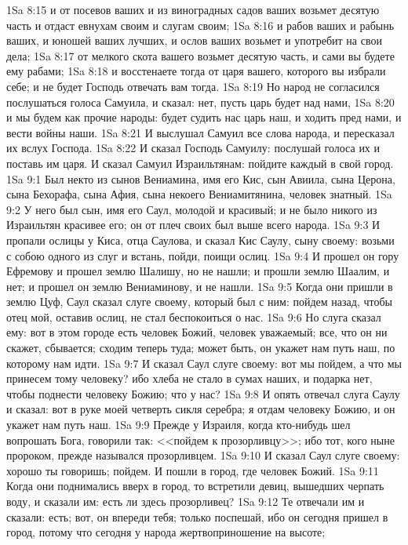 \vs 1Sa 8:15 и от посевов ваших и из виноградных садов ваших возьмет десятую часть и отдаст евнухам своим и слугам своим;
\vs 1Sa 8:16 и рабов ваших и рабынь ваших, и юношей ваших лучших, и ослов ваших возьмет и употребит на свои дела;
\vs 1Sa 8:17 от мелкого скота вашего возьмет десятую часть, и сами вы будете ему рабами;
\vs 1Sa 8:18 и восстенаете тогда от царя вашего, которого вы избрали себе; и не будет Господь отвечать вам тогда.
\vs 1Sa 8:19 Но народ не согласился послушаться голоса Самуила, и сказал: нет, пусть царь будет над нами,
\vs 1Sa 8:20 и мы будем как прочие народы: будет судить нас царь наш, и ходить пред нами, и вести войны наши.
\vs 1Sa 8:21 И выслушал Самуил все слова народа, и пересказал их вслух Господа.
\vs 1Sa 8:22 И сказал Господь Самуилу: послушай голоса их и поставь им царя. И сказал Самуил Израильтянам: пойдите каждый в свой город.
\vs 1Sa 9:1 Был некто из сынов Вениамина, имя его Кис, сын Авиила, сына Церона, сына Бехорафа, сына Афия, сына некоего Вениамитянина, человек знатный.
\vs 1Sa 9:2 У него был сын, имя его Саул, молодой и красивый; и не было никого из Израильтян красивее его; он от плеч своих был выше всего народа.
\vs 1Sa 9:3 И пропали ослицы у Киса, отца Саулова, и сказал Кис Саулу, сыну своему: возьми с собою одного из слуг и встань, пойди, поищи ослиц.
\vs 1Sa 9:4 И прошел он гору Ефремову и прошел землю Шалишу, но не нашли; и прошли землю Шаалим, и  нет; и прошел он землю Вениаминову, и не нашли.
\vs 1Sa 9:5 Когда они пришли в землю Цуф, Саул сказал слуге своему, который был с ним: пойдем назад, чтобы отец мой, оставив ослиц, не стал беспокоиться о нас.
\vs 1Sa 9:6 Но слуга сказал ему: вот в этом городе есть человек Божий, человек уважаемый; все, что он ни скажет, сбывается; сходим теперь туда; может быть, он укажет нам путь наш, по которому нам идти.
\vs 1Sa 9:7 И сказал Саул слуге своему: вот мы пойдем, а что мы принесем тому человеку? ибо хлеба не стало в сумах наших, и подарка нет, чтобы поднести человеку Божию; что у нас?
\vs 1Sa 9:8 И опять отвечал слуга Саулу и сказал: вот в руке моей четверть сикля серебра; я отдам человеку Божию, и он укажет нам путь наш.
\vs 1Sa 9:9 Прежде у Израиля, когда кто-нибудь шел вопрошать Бога, говорили так: <<пойдем к прозорливцу>>; ибо тот, кого  ныне пророком, прежде назывался прозорливцем.
\vs 1Sa 9:10 И сказал Саул слуге своему: хорошо ты говоришь; пойдем. И пошли в город, где человек Божий.
\vs 1Sa 9:11 Когда они поднимались вверх в город, то встретили девиц, вышедших черпать воду, и сказали им: есть ли здесь прозорливец?
\vs 1Sa 9:12 Те отвечали им и сказали: есть; вот, он впереди тебя; только поспешай, ибо он сегодня пришел в город, потому что сегодня у народа жертвоприношение на высоте;
